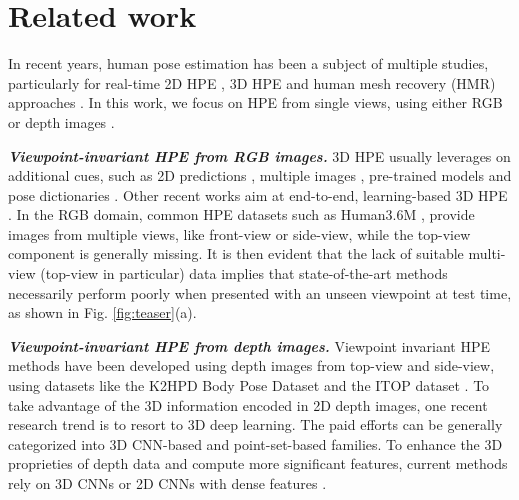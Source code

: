 \documentclass[10pt,twocolumn,letterpaper]{article}
\begin{document}
\section{Related work}
\label{sec:related}

In recent years, human pose estimation has been a subject of multiple studies, particularly for real-time 2D HPE \cite{cao2017realtime}, 3D HPE \cite{tome2017lifting} and human mesh recovery (HMR) approaches \cite{kolotouros2019learning, kocabas2019vibe}.
In this work, we focus on HPE from single views, using either RGB \cite{cao2017realtime,he2017mask} or depth images \cite{haque2016towards,moon2018v2v,xiong2019a2j}.

\textit{\textbf{Viewpoint-invariant HPE from RGB images.}} 3D HPE usually leverages on additional cues, such as 2D predictions \cite{tome2017lifting, wang20203d, tekin2017learning}, multiple images \cite{zhou2016sparseness}, pre-trained models \cite{katircioglu2018learning} and pose dictionaries \cite{sanzari2016bayesian}. Other recent works aim at end-to-end, learning-based 3D HPE \cite{rogez2019lcr, tian2019densely, liu2020feature}.
 In the RGB domain, common HPE datasets such as Human3.6M \cite{ionescu2014human}, provide images from multiple views, like front-view or side-view, while the top-view component is generally missing. 
It is then evident that the lack of suitable multi-view (top-view in particular) data implies that 
state-of-the-art methods \cite{cao2017realtime,tome2017lifting, kolotouros2019learning,kocabas2019vibe} necessarily perform poorly when presented with an unseen viewpoint at test time, as shown in Fig. \ref{fig:teaser}(a).

\textit{\textbf{Viewpoint-invariant HPE from depth images.}}
Viewpoint invariant HPE methods have been developed using depth images \cite{haque2016towards,moon2018v2v,xiong2019a2j} from top-view and side-view, using datasets like the K2HPD Body Pose Dataset \cite{wang2016human} and the ITOP dataset \cite{haque2016towards}.
To take advantage of the 3D information encoded in 2D depth images, one recent research trend is to resort to 3D deep learning. The paid efforts can be generally categorized into 3D CNN-based and point-set-based families.
To enhance the 3D proprieties of depth data and compute more significant features, current methods rely on 3D CNNs \cite{haque2016towards,moon2018v2v} or 2D CNNs with dense features \cite{xiong2019a2j}.
\end{document}

